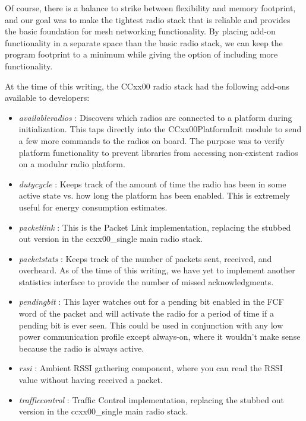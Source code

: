 \documentclass{article}
\begin{document}
Of course, there is a balance to strike between flexibility and memory footprint, and our goal was to make the tightest radio stack that is 
reliable and provides the basic foundation for mesh networking functionality. By placing add-on functionality in a separate space than the basic radio stack, we can keep the program footprint to a minimum while giving the option of including
more functionality.

At the time of this writing, the CCxx00 radio stack had the following add-ons available to developers:

\begin{itemize}
	\item \emph{availableradios} : Discovers which radios are connected to 
	a platform during initialization. This taps directly into the 
	CCxx00PlatformInit module to send a few more commands to the radios on 
	board. The purpose was to verify platform functionality to prevent 
	libraries from accessing non-existent radios on a modular radio
	platform.
	
	\item \emph{dutycycle} : Keeps track of the amount of time the radio has been in some active state vs. how long the platform has been enabled. This is extremely useful for energy consumption estimates.
	\item \emph{packetlink} : This is the Packet Link implementation,
	replacing the stubbed out version in the ccxx00\_single main radio 
	stack.
	\item \emph{packetstats} : Keeps track of the number of packets sent, received, and overheard. As of the time of this writing, we have yet to implement another statistics interface to provide the number of missed acknowledgments.
	\item \emph{pendingbit} : This layer watches out for a pending bit enabled in the FCF word of the packet and will activate the radio for a period of time if a pending bit is ever seen. This could be used in conjunction with any low power communication profile except always-on, where it wouldn't make sense because the radio is always active.	
	\item \emph{rssi} : Ambient RSSI gathering component, where you can
	read the RSSI value without having received a packet.
	\item \emph{trafficcontrol} : Traffic Control implementation, replacing
	the stubbed out version in the ccxx00\_single main radio stack.
\end{itemize}
\end{document}
